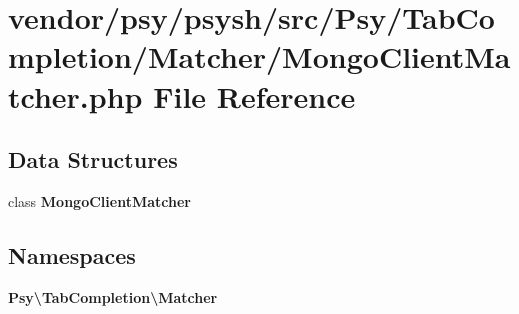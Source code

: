 \section{vendor/psy/psysh/src/\+Psy/\+Tab\+Completion/\+Matcher/\+Mongo\+Client\+Matcher.php File Reference}
\label{_mongo_client_matcher_8php}
\subsection*{Data Structures}
\begin{DoxyCompactItemize}
\item 
class {\bf Mongo\+Client\+Matcher}
\end{DoxyCompactItemize}
\subsection*{Namespaces}
\begin{DoxyCompactItemize}
\item 
 {\bf Psy\textbackslash{}\+Tab\+Completion\textbackslash{}\+Matcher}
\end{DoxyCompactItemize}
